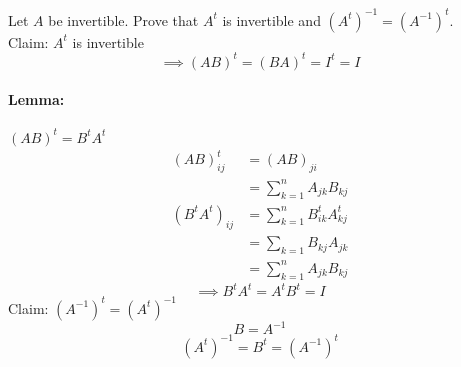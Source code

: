 Let $A$ be invertible. Prove that $A^t$ is invertible and $(A^t)^{-1}
= (A^{-1})^t$.
\\Claim: $A^t$ is invertible
\begin{equation}
\implies (AB)^t =(BA)^t = I^t = I
\end{equation}
\paragraph{Lemma:} $(AB)^t = B^tA^t$
\begin{align}
(AB)^t_{ij} &= (AB)^{}_{ji} \\
&= \sum\limits_{k=1}^nA_{jk}B_{kj}\\
(B^tA^t)_{ij} &= \sum\limits_{k=1}^nB^t_{ik}A^t_{kj}\\
&=\sum\limits_{k=1}B_{kj}A_{jk}\\
&=\sum\limits_{k=1}^nA_{jk}B_{kj}
\end{align}
\begin{equation}
\implies B^tA^t = A^tB^t = I
\end{equation}
Claim: $(A^{-1})^t = (A^t)^{-1}$
\begin{equation}
B=A^{-1}
\end{equation}
\begin{equation}
(A^t)^{-1} = B^t = (A^{-1})^t
\end{equation}
